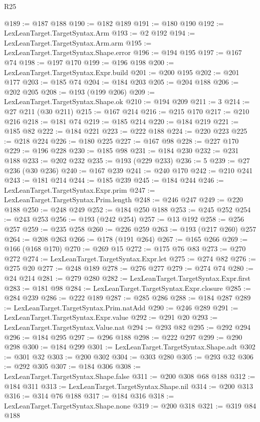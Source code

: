 \begin{lexlean}{R25}
\begin{coremodule}
@189 := @187 @188
@190 := @182 @189
@191 := @180 @190
@192 := LexLeanTarget.TargetSyntax.Arm
@193 := @2 @192
@194 := LexLeanTarget.TargetSyntax.Arm.arm
@195 := LexLeanTarget.TargetSyntax.Shape.error
@196 := @194 @195
@197 := @167 @74
@198 := @197 @170
@199 := @196 @198
@200 := LexLeanTarget.TargetSyntax.Expr.build
@201 := @200 @195
@202 := @201 @177
@203 := @185 @74
@204 := @184 @203
@205 := @204 @188
@206 := @202 @205
@208 := @193 (@199 @206)
@209 := LexLeanTarget.TargetSyntax.Shape.ok
@210 := @194 @209
@211 := 3
@214 := @27 @211 (@30 @211)
@215 := @167 @214
@216 := @215 @170
@217 := @210 @216
@218 := @181 @74
@219 := @185 @214
@220 := @184 @219
@221 := @185 @82
@222 := @184 @221
@223 := @222 @188
@224 := @220 @223
@225 := @218 @224
@226 := @180 @225
@227 := @167 @98
@228 := @227 @170
@229 := @196 @228
@230 := @185 @98
@231 := @184 @230
@232 := @231 @188
@233 := @202 @232
@235 := @193 (@229 @233)
@236 := 5
@239 := @27 @236 (@30 @236)
@240 := @167 @239
@241 := @240 @170
@242 := @210 @241
@243 := @181 @214
@244 := @185 @239
@245 := @184 @244
@246 := LexLeanTarget.TargetSyntax.Expr.prim
@247 := LexLeanTarget.TargetSyntax.Prim.length
@248 := @246 @247
@249 := @220 @188
@250 := @248 @249
@252 := @184 @250 @188
@253 := @245 @252
@254 := @243 @253
@256 := @193 (@242 @254)
@257 := @13 @192
@258 := @256 @257
@259 := @235 @258
@260 := @226 @259
@263 := @193 (@217 @260) @257
@264 := @208 @263
@266 := @178 (@191 @264)
@267 := @165 @266
@269 := @166 (@168 @170)
@270 := @269 @15
@272 := @175 @76 @83
@273 := @270 @272
@274 := LexLeanTarget.TargetSyntax.Expr.let
@275 := @274 @82
@276 := @275 @20
@277 := @248 @189
@278 := @276 @277
@279 := @274 @74
@280 := @24 @214
@281 := @279 @280
@282 := LexLeanTarget.TargetSyntax.Expr.first
@283 := @181 @98
@284 := LexLeanTarget.TargetSyntax.Expr.closure
@285 := @284 @239
@286 := @222 @189
@287 := @285 @286
@288 := @184 @287
@289 := LexLeanTarget.TargetSyntax.Prim.natAdd
@290 := @246 @289
@291 := LexLeanTarget.TargetSyntax.Expr.value
@292 := @291 @20
@293 := LexLeanTarget.TargetSyntax.Value.nat
@294 := @293 @82
@295 := @292 @294
@296 := @184 @295
@297 := @296 @188
@298 := @222 @297
@299 := @290 @298
@300 := @184 @299
@301 := LexLeanTarget.TargetSyntax.Shape.adt
@302 := @301 @32
@303 := @200 @302
@304 := @303 @280
@305 := @293 @32
@306 := @292 @305
@307 := @184 @306
@308 := LexLeanTarget.TargetSyntax.Shape.false
@311 := @200 @308 @68 @188
@312 := @184 @311
@313 := LexLeanTarget.TargetSyntax.Shape.nil
@314 := @200 @313
@316 := @314 @76 @188
@317 := @184 @316
@318 := LexLeanTarget.TargetSyntax.Shape.none
@319 := @200 @318
@321 := @319 @84 @188

\end{coremodule}
\end{lexlean}

